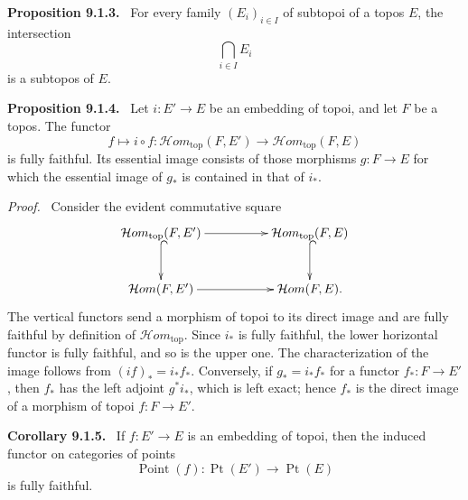 \documentclass[11pt]{article}
\newcommand{\Point}{\operatorname{Point}}
\newcommand{\Ppoint}{\operatorname{Pt}}
\newcommand{\Hhom}{\mathcal{H}om}
\newcommand{\Hhomtop}{\mathcal{H}om_{\mathrm{top}}}
\newenvironment{statement}[1]{\par\medskip\noindent\textbf{#1.}\ }{\par\medskip}
\newenvironment{prooftext}{\par\noindent\emph{Proof.}\ }{\par\medskip}
\begin{document}
\begin{statement}{Proposition 9.1.3}
For every family \((E_i)_{i\in I}\) of subtopoi of a topos \(E\), the intersection
\[
\bigcap_{i\in I}E_i
\]
is a subtopos of \(E\).
\end{statement}

\begin{statement}{Proposition 9.1.4}
Let \(i:E'\to E\) be an embedding of topoi, and let \(F\) be a topos. The functor
\[
f\longmapsto i\circ f:\Hhomtop(F,E')\longrightarrow \Hhomtop(F,E)
\tag{9.1.4.1}
\]
is fully faithful. Its essential image consists of those morphisms \(g:F\to E\) for which the essential image of \(g_*\) is contained in that of \(i_*\).
\end{statement}

\begin{prooftext}
Consider the evident commutative square
\[
\xymatrix@C=1.75cm@R=1cm{
\Hhomtop(F,E')\ar@{^{(}->}[d]\ar[r]&\Hhomtop(F,E)\ar@{^{(}->}[d]\\
\Hhom(F,E')\ar[r]&\Hhom(F,E).
}
\]
The vertical functors send a morphism of topoi to its direct image and are fully faithful by definition of \(\Hhomtop\). Since \(i_*\) is fully faithful, the lower horizontal functor is fully faithful, and so is the upper one. The characterization of the image follows from \((if)_*=i_*f_*\). Conversely, if \(g_*=i_*f_*\) for a functor \(f_*:F\to E'\), then \(f_*\) has the left adjoint \(g^*i_*\), which is left exact; hence \(f_*\) is the direct image of a morphism of topoi \(f:F\to E'\).
\end{prooftext}

\begin{statement}{Corollary 9.1.5}
If \(f:E'\to E\) is an embedding of topoi, then the induced functor on categories of points
\[
\Point(f):\Ppoint(E')\longrightarrow \Ppoint(E)
\tag{9.1.5.1}
\]
is fully faithful.
\end{statement}
\end{document}
